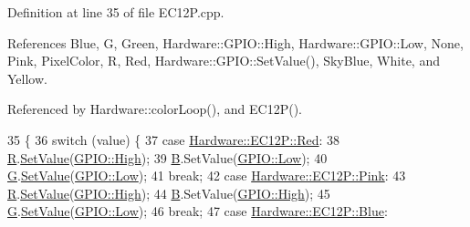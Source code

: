 Definition at line 35 of file E\+C12\+P.\+cpp.



References Blue, G, Green, Hardware\+::\+G\+P\+I\+O\+::\+High, Hardware\+::\+G\+P\+I\+O\+::\+Low, None, Pink, Pixel\+Color, R, Red, Hardware\+::\+G\+P\+I\+O\+::\+Set\+Value(), Sky\+Blue, White, and Yellow.



Referenced by Hardware\+::color\+Loop(), and E\+C12\+P().


\begin{DoxyCode}
35                                      \{
36   \textcolor{keywordflow}{switch} (value) \{
37   \textcolor{keywordflow}{case} \hyperlink{class_hardware_1_1_e_c12_p_a8341f410cd939bf03160fe239bc782aaa3b57c8754eb52c7023d81c7c45687f05}{Hardware::EC12P::Red}:
38     \hyperlink{class_hardware_1_1_e_c12_p_a0a4f03a37d709349994e800e44f5c781}{R}.\hyperlink{class_hardware_1_1_g_p_i_o_a2564893797de6a2dab596c4fc990b919}{SetValue}(\hyperlink{class_hardware_1_1_g_p_i_o_ad357201dc1ad13ad96ba1773108a5f6da93471c709b9d95bfaef4794b4c41e22c}{GPIO::High});
39     \hyperlink{struct_b}{B}.SetValue(\hyperlink{class_hardware_1_1_g_p_i_o_ad357201dc1ad13ad96ba1773108a5f6da93de7d5aa4e577175e4fe1fcb0206a85}{GPIO::Low});
40     \hyperlink{class_hardware_1_1_e_c12_p_a7afd63c14e12d861c8b20614ef34d70e}{G}.\hyperlink{class_hardware_1_1_g_p_i_o_a2564893797de6a2dab596c4fc990b919}{SetValue}(\hyperlink{class_hardware_1_1_g_p_i_o_ad357201dc1ad13ad96ba1773108a5f6da93de7d5aa4e577175e4fe1fcb0206a85}{GPIO::Low});
41     \textcolor{keywordflow}{break};
42   \textcolor{keywordflow}{case} \hyperlink{class_hardware_1_1_e_c12_p_a8341f410cd939bf03160fe239bc782aaab5841c141282166e57407746841ff248}{Hardware::EC12P::Pink}:
43     \hyperlink{class_hardware_1_1_e_c12_p_a0a4f03a37d709349994e800e44f5c781}{R}.\hyperlink{class_hardware_1_1_g_p_i_o_a2564893797de6a2dab596c4fc990b919}{SetValue}(\hyperlink{class_hardware_1_1_g_p_i_o_ad357201dc1ad13ad96ba1773108a5f6da93471c709b9d95bfaef4794b4c41e22c}{GPIO::High});
44     \hyperlink{struct_b}{B}.SetValue(\hyperlink{class_hardware_1_1_g_p_i_o_ad357201dc1ad13ad96ba1773108a5f6da93471c709b9d95bfaef4794b4c41e22c}{GPIO::High});
45     \hyperlink{class_hardware_1_1_e_c12_p_a7afd63c14e12d861c8b20614ef34d70e}{G}.\hyperlink{class_hardware_1_1_g_p_i_o_a2564893797de6a2dab596c4fc990b919}{SetValue}(\hyperlink{class_hardware_1_1_g_p_i_o_ad357201dc1ad13ad96ba1773108a5f6da93de7d5aa4e577175e4fe1fcb0206a85}{GPIO::Low});
46     \textcolor{keywordflow}{break};
47   \textcolor{keywordflow}{case} \hyperlink{class_hardware_1_1_e_c12_p_a8341f410cd939bf03160fe239bc782aaa3f67a6d3b6004f86b8e4a477b3c5f915}{Hardware::EC12P::Blue}:

\end{DoxyCode}
